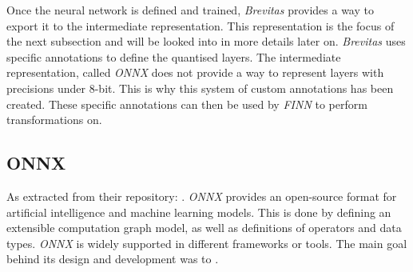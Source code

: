 Once the neural network is defined and trained, \emph{Brevitas} provides a way to export it to the intermediate representation. This representation is the focus of the next subsection and will be looked into in more details later on. \emph{Brevitas} uses specific annotations to define the quantised layers.  The intermediate representation, called \emph{ONNX} does not provide a way to represent layers with precisions under 8-bit. This is why this system of custom annotations has been created. These specific annotations can then be used by \emph{FINN} to perform transformations on.


\subsection{ONNX}

As extracted from their repository: . \emph{ONNX} provides an open-source format for artificial intelligence and machine learning models. This is done by defining an extensible computation graph model, as well as definitions of operators and data types. \emph{ONNX} is widely supported in different frameworks or tools. The main goal behind its design and development was to .






